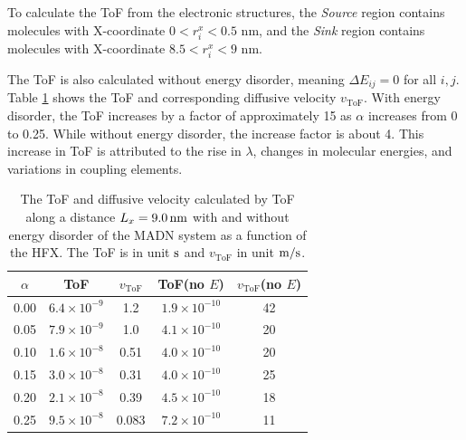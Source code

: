 \documentclass[%
 reprint,
superscriptaddress,
 amsmath,amssymb,
 aps,
prb,
floatfix
]{revtex4-2}
\begin{document}
To calculate the ToF from the electronic structures, the \textit{Source} region contains molecules with X-coordinate $0 < r^x_i < 0.5$ nm, and the \textit{Sink} region contains molecules with X-coordinate $8.5 < r^x_i < 9$ nm. 

The ToF is also calculated without energy disorder, meaning $\Delta E_{ij}=0$ for all $i,j$.
Table \ref{tab:ToF_MADN_HFX} shows the ToF and corresponding diffusive velocity $v_\text{ToF}$.
With energy disorder, the ToF increases by a factor of approximately 15 as $\alpha$ increases from 0 to 0.25.  
While without energy disorder, the increase factor is about 4. This increase in ToF is attributed to the rise in $\lambda$, changes in molecular energies, and variations in coupling elements.

\begin{table}[tbp]%
\caption{\label{tab:ToF_MADN_HFX}%
The ToF and diffusive velocity calculated by ToF along a distance $L_x = \unit[9.0]{nm}$ with and without energy disorder of the MADN system as a function of the HFX. The ToF is in unit $\unit[]{s}$ and $v_\text{ToF}$ in unit $\unit[]{m/s}$.
}
\begin{ruledtabular}
  \begin{tabular}{c c c c c}
        $\alpha$ & ToF& $v_\text{ToF}$ & ToF(no $E$)& $v_\text{ToF}$(no $E$) \\
    \hline
        0.00 &  $6.4 \times 10^{-9}$ & 1.2 & $1.9 \times 10^{-10}$ & 42 \\
        0.05 & $ 7.9 \times 10^{-9}$ & 1.0 & $4.1 \times 10^{-10}$ & 20 \\
        0.10 & $ 1.6 \times 10^{-8}$ & 0.51 & $4.0 \times 10^{-10} $ & 20 \\
        0.15 & $ 3.0 \times 10^{-8}$ & 0.31 & $4.0 \times 10^{-10} $ & 25 \\
        0.20 & $ 2.1 \times 10^{-8}$ & 0.39 & $4.5 \times 10^{-10}$ & 18 \\
        0.25 & $ 9.5 \times 10^{-8}$ & 0.083 & $7.2 \times 10^{-10}$ & 11 \\
    \end{tabular}
\end{ruledtabular}
\end{table}
\end{document}
